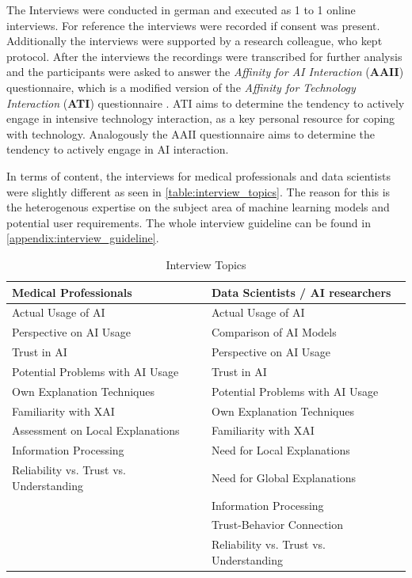 \documentclass[11pt,a4paper,english]{scrreprt}
\begin{document}
The Interviews were conducted in german and executed as 1 to 1 online interviews. For reference the interviews were recorded if consent was present. Additionally the interviews were supported by a research colleague, who kept protocol. After the interviews the recordings were transcribed for further analysis and the participants were asked to answer the \textit{Affinity for AI Interaction} (\textbf{AAII}) questionnaire, which is a modified version of the \textit{Affinity for Technology Interaction} (\textbf{ATI}) questionnaire \parencite{franke_personal_2019}. ATI aims to determine the tendency to actively engage in intensive technology interaction, as a key personal resource for coping with technology. Analogously the AAII questionnaire aims to determine the tendency to actively engage in AI interaction.

In terms of content, the interviews for medical professionals and data scientists were slightly different as seen in \autoref{table:interview_topics}. The reason for this is the heterogenous expertise on the subject area of machine learning models and potential user requirements. The whole interview guideline can be found in \autoref{appendix:interview_guideline}.
\begin{table}[htbp]
    \centering
    \begin{tabularx}{\textwidth}{ l l }
        \toprule
        Medical Professionals & Data Scientists / AI researchers \\
        \midrule
        Actual Usage of AI & Actual Usage of AI \\ 
        Perspective on AI Usage & Comparison of AI Models \\  
        Trust in AI & Perspective on AI Usage \\
        Potential Problems with AI Usage & Trust in AI \\
        Own Explanation Techniques & Potential Problems with AI Usage \\
        Familiarity with XAI & Own Explanation Techniques \\
        Assessment on Local Explanations & Familiarity with XAI \\
        Information Processing & Need for Local Explanations \\
        Reliability vs. Trust vs. Understanding & Need for Global Explanations \\
         & Information Processing \\
         & Trust-Behavior Connection \\
         & Reliability vs. Trust vs. Understanding \\
        \bottomrule
    \end{tabularx}
    \caption{Interview Topics}
    \label{table:interview_topics}
\end{table}
\end{document}
